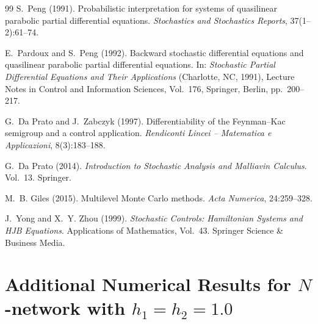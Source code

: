 \documentclass[11pt]{article}
\theoremstyle{definition}
\theoremstyle{plain}
\begin{document}
\begin{appendices}
\begin{thebibliography}{99}
 S.~Peng (1991). \newblock Probabilistic interpretation for systems of quasilinear parabolic partial differential equations. \newblock \emph{Stochastics and Stochastics Reports}, 37(1--2):61--74.

 E.~Pardoux and S.~Peng (1992). \newblock Backward stochastic differential equations and quasilinear parabolic partial differential equations. \newblock In: \emph{Stochastic Partial Differential Equations and Their Applications} (Charlotte, NC, 1991), Lecture Notes in Control and Information Sciences, Vol.~176, Springer, Berlin, pp.~200--217.

 G.~Da Prato and J.~Zabczyk (1997). \newblock Differentiability of the Feynman--Kac semigroup and a control application. \newblock \emph{Rendiconti Lincei -- Matematica e Applicazioni}, 8(3):183--188.

 G.~Da Prato (2014). \newblock \emph{Introduction to Stochastic Analysis and Malliavin Calculus}. \newblock Vol.~13. Springer.

 M.~B. Giles (2015). \newblock Multilevel Monte Carlo methods. \newblock \emph{Acta Numerica}, 24:259--328.

 J.~Yong and X.~Y. Zhou (1999). \newblock \emph{Stochastic Controls: Hamiltonian Systems and HJB Equations}. \newblock Applications of Mathematics, Vol.~43. Springer Science \& Business Media.

\end{thebibliography}
\fi

\section{Additional Numerical Results for \texorpdfstring{$N$}{N}-network with \texorpdfstring{$h_1 = h_2 = 1.0$}{h1 = h2 = 1.0}}\label{ssec:results-tables}


\end{appendices}
\end{document}
